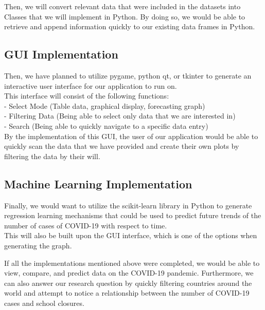\documentclass[fontsize=11pt]{article}
\begin{document}
    Then, we will convert relevant data that were included in the datasets into Classes that we will implement in Python. By doing so, we would be able to retrieve and append information quickly to our existing data frames in Python. 

\subsection*{GUI Implementation}
    Then, we have planned to utilize pygame, python qt, or tkinter to generate an interactive user interface for our application to run on. \\
    
    This interface will consist of the following functions: \\
    
    -	Select Mode (Table data, graphical display, forecasting graph)\\
    -	Filtering Data (Being able to select only data that we are interested in)\\
    -	Search (Being able to quickly navigate to a specific data entry)\\
    
    By the implementation of this GUI, the user of our application would be able to quickly scan the data that we have provided and create their own plots by filtering the data by their will. 

\subsection*{Machine Learning Implementation}
    Finally, we would want to utilize the scikit-learn library in Python to generate regression learning mechanisms that could be used to predict future trends of the number of cases of COVID-19 with respect to time. \\
    
    This will also be built upon the GUI interface, which is one of the options when generating the graph. \\

\hspace{4pt}

If all the implementations mentioned above were completed, we would be able to view, compare, and predict data on the COVID-19 pandemic. Furthermore, we can also answer our research question by quickly filtering countries around the world and attempt to notice a relationship between the number of COVID-19 cases and school closures. \\
\end{document}
